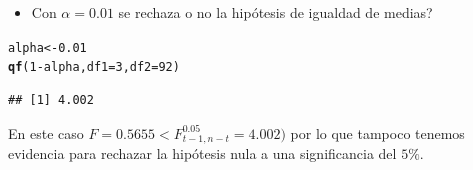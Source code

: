 \documentclass[a4paper]{scrartcl}\usepackage[]{graphicx}\usepackage[]{color}
\makeatletter
\newcommand{\hlnum}[1]{\textcolor[rgb]{0.686,0.059,0.569}{#1}}%
\newcommand{\hlopt}[1]{\textcolor[rgb]{0,0,0}{#1}}%
\newcommand{\hlstd}[1]{\textcolor[rgb]{0.345,0.345,0.345}{#1}}%
\newcommand{\hlkwb}[1]{\textcolor[rgb]{0.69,0.353,0.396}{#1}}%
\newcommand{\hlkwc}[1]{\textcolor[rgb]{0.333,0.667,0.333}{#1}}%
\newcommand{\hlkwd}[1]{\textcolor[rgb]{0.737,0.353,0.396}{\textbf{#1}}}%
\newenvironment{kframe}{%
 \def\at@end@of@kframe{}%
 \ifinner\ifhmode%
  \def\at@end@of@kframe{\end{minipage}}%
  \begin{minipage}{\columnwidth}%
 \fi\fi%
 \def\FrameCommand##1{\hskip\@totalleftmargin \hskip-\fboxsep
 \colorbox{shadecolor}{##1}\hskip-\fboxsep
     \hskip-\linewidth \hskip-\@totalleftmargin \hskip\columnwidth}%
 \MakeFramed {\advance\hsize-\width
   \@totalleftmargin\z@ \linewidth\hsize
   \@setminipage}}%
 {\par\unskip\endMakeFramed%
 \at@end@of@kframe}
\newenvironment{knitrout}{}{} %
\makeatother
\begin{document}
\begin{itemize}
  \item Con $\alpha = 0.01$ se rechaza o no la hipótesis de igualdad de medias?
\end{itemize}
\begin{knitrout}
\color{fgcolor}\begin{kframe}
\begin{alltt}
\hlstd{alpha} \hlkwb{<-} \hlnum{0.01}
\hlkwd{qf}\hlstd{(}\hlnum{1} \hlopt{-} \hlstd{alpha,} \hlkwc{df1}\hlstd{=} \hlnum{3}\hlstd{,} \hlkwc{df2} \hlstd{=} \hlnum{92}\hlstd{)}
\end{alltt}
\begin{verbatim}
## [1] 4.002
\end{verbatim}
\end{kframe}
\end{knitrout}
En este caso $F = 0.5655 < F_{t-1, n-t}^{0.05} = 4.002)$ por lo que tampoco tenemos evidencia para rechazar la hipótesis nula a una significancia del $5\%$.
\end{document}
